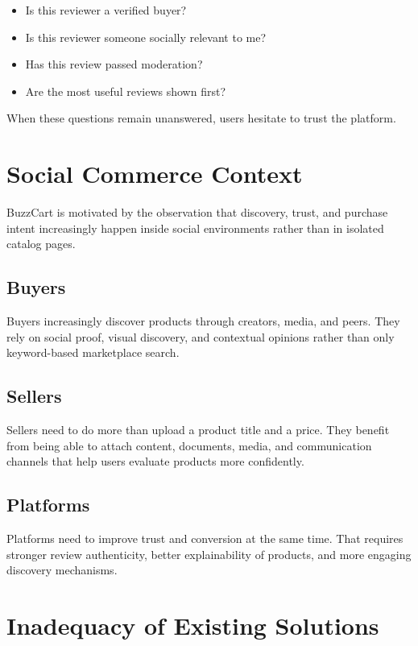 \documentclass[12pt,letterpaper]{report}
\begin{document}
\begin{itemize}
  \item Is this reviewer a verified buyer?
  \item Is this reviewer someone socially relevant to me?
  \item Has this review passed moderation?
  \item Are the most useful reviews shown first?
\end{itemize}

When these questions remain unanswered, users hesitate to trust the platform.

\section{Social Commerce Context}

BuzzCart is motivated by the observation that discovery, trust, and purchase intent increasingly happen inside social environments rather than in isolated catalog pages.

\subsection{Buyers}

Buyers increasingly discover products through creators, media, and peers. They rely on social proof, visual discovery, and contextual opinions rather than only keyword-based marketplace search.

\subsection{Sellers}

Sellers need to do more than upload a product title and a price. They benefit from being able to attach content, documents, media, and communication channels that help users evaluate products more confidently.

\subsection{Platforms}

Platforms need to improve trust and conversion at the same time. That requires stronger review authenticity, better explainability of products, and more engaging discovery mechanisms.

\section{Inadequacy of Existing Solutions}
\end{document}
